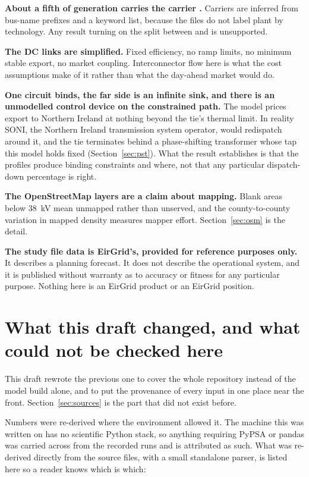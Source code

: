 \documentclass[11pt,a4paper]{article}
\begin{document}
\textbf{About a fifth of generation carries the carrier .}
Carriers are inferred from bus-name prefixes and a keyword list, because the
files do not label plant by technology. Any result turning on the split between
 and  is unsupported.

\textbf{The DC links are simplified.} Fixed efficiency, no ramp limits, no
minimum stable export, no market coupling. Interconnector flow here is what the
cost assumptions make of it rather than what the day-ahead market would do.

\textbf{One circuit binds, the far side is an infinite sink, and there is an
unmodelled control device on the constrained path.} The model prices export to
Northern Ireland at nothing beyond the tie's thermal limit. In reality SONI,
the Northern Ireland transmission system operator, would redispatch
around it, and the tie terminates behind a phase-shifting transformer whose tap
this model holds fixed (Section~\ref{sec:pst}). What the result establishes is
that the profiles produce binding constraints and where, not that any
particular dispatch-down percentage is right.

\textbf{The OpenStreetMap layers are a claim about mapping.} Blank areas below
38~kV mean unmapped rather than unserved, and the county-to-county variation in
mapped density measures mapper effort. Section~\ref{sec:osm} is the detail.

\textbf{The study file data is EirGrid's, provided for reference purposes
only.} It describes a planning forecast. It does not describe the operational
system, and it is published without warranty as to accuracy or fitness for any
particular purpose. Nothing here is an EirGrid product or an EirGrid position.

\section{What this draft changed, and what could not be checked here}
\label{sec:corrections}

This draft rewrote the previous one to cover the whole repository instead of
the model build alone, and to put the provenance of every input in one place
near the front. Section~\ref{sec:sources} is the part that did not exist
before.

Numbers were re-derived where the environment allowed it. The machine this was
written on has no scientific Python stack, so anything requiring PyPSA or
pandas was carried across from the recorded runs and is attributed as such.
What was re-derived directly from the source files, with a small standalone
parser, is listed here so a reader knows which is which:
\end{document}
